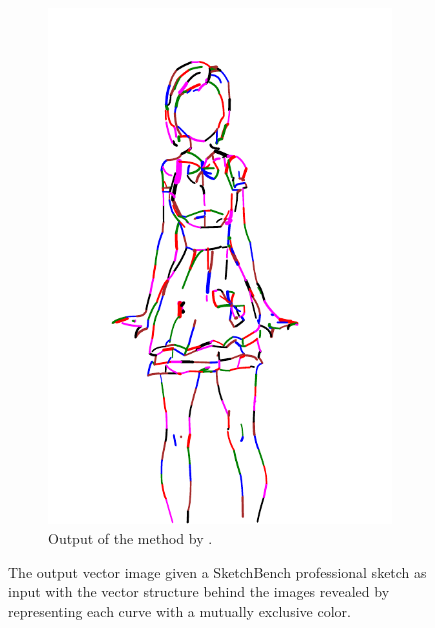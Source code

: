 \begin{figure}[h]
\begin{subfigure}{.3\textwidth}
    \includegraphics[width=\textwidth]{graphics/outputs/virtual-sketching/order/sketchbench-black_Art_freeform_AG_03_Branislav Mirkovic_norm_cleaned.pdf}
    \caption{Output of the method by \citet{mo2021virtualsketching}.}
    \end{subfigure}
    \caption{The output vector image given a SketchBench professional sketch as input with the vector structure behind the images revealed by representing each curve with a mutually exclusive color.}
    \label{fig:sketchbench-2.order}
\end{figure}